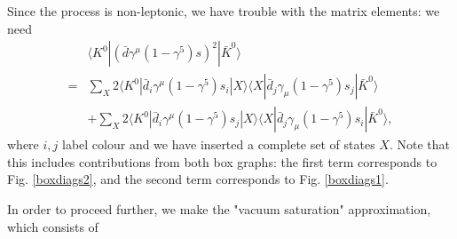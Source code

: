 Since the process is non-leptonic, we have trouble with the matrix elements: we need
\begin{equation}
\begin{split}
&\langle K^0 | (\bar{d}\gamma^\mu (1-\gamma^5)s)^2| \bar{K}^0 \rangle \\
= &\sum_X 2 \langle K^0 | \bar{d}_i \gamma^\mu (1-\gamma^5) s_i | X \rangle \langle X| \bar{d}_j \gamma_\mu (1-\gamma^5) s_j | \bar{K}^0 \rangle \\
&+\sum_X 2 \langle K^0 | \bar{d}_i \gamma^\mu (1-\gamma^5) s_j | X \rangle \langle X| \bar{d}_j \gamma_\mu (1-\gamma^5) s_i | \bar{K}^0 \rangle,
\end{split}
\end{equation}
where $i,j$ label colour and we have inserted a complete set of states $X$. Note that this includes contributions from both box graphs: the first term corresponds to Fig. \ref{boxdiags2}, and the second term corresponds to Fig. \ref{boxdiags1}.

In order to proceed further, we make the "vacuum saturation" approximation, which consists of

